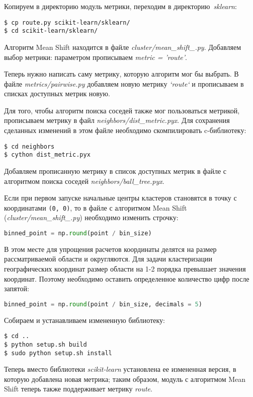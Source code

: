 Копируем в директорию модуль метрики, переходим в директорию~\emph{sklearn}:
\begin{lstlisting}
$ cp route.py scikit-learn/sklearn/
$ cd scikit-learn/sklearn/
\end{lstlisting}

Алгоритм Mean Shift находится в файле \emph{cluster/mean\_shift\_.py}.
Добавляем выбор метрики: параметром прописываем \emph{metric = 'route'}.

Теперь нужно написать саму метрику, которую алгоритм мог бы выбрать.
В файле \emph{metrics/pairwise.py} добавляем новую метрику \emph{`route`} и прописываем в
списках доступных метрик новую.

Для того, чтобы алгоритм поиска соседей также мог пользоваться метрикой, прописываем метрику в
файл \emph{neighbors/dist\_metric.pyx}. Для сохранения сделанных изменений в этом файле
необходимо скомпилировать c-библиотеку:
\begin{lstlisting}
$ cd neighbors
$ cython dist_metric.pyx
\end{lstlisting}

Добавляем прописанную метрику в список доступных метрик в файле с алгоритмом поиска соседей
\emph{neighbors/ball\_tree.pyx}.

Если при первом запуске начальные центры кластеров становятся в точку с координатами
\texttt{(0, 0)}, то в файле с алгоритмом Mean Shift\\ (\emph{cluster/mean\_shift\_.py}) необходимо
изменить строчку:
\begin{lstlisting}[language=Python]
binned_point = np.round(point / bin_size)
\end{lstlisting}

В этом месте для упрощения расчетов координаты делятся на размер рассматриваемой области
и округляются. Для задачи кластеризации географических координат размер области на 1-2 порядка
превышает значения координат. Поэтому необходимо оставить определенное количество цифр после
запятой:
\begin{lstlisting}[language=Python]
binned_point = np.round(point / bin_size, decimals = 5)
\end{lstlisting}

Собираем и устанавливаем измененную библиотеку:
\begin{lstlisting}
$ cd ..
$ python setup.sh build
$ sudo python setup.sh install
\end{lstlisting}

Теперь вместо библиотеки \emph{scikit-learn} установлена ее измененная версия, в которую
добавлена новая метрика; таким образом, модуль с алгоритмом Mean Shift теперь также поддерживает
метрику \emph{route}.

